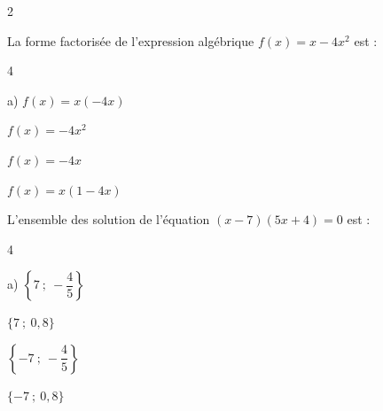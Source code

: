 \documentclass[11pt,a4paper]{article}  %
\begin{document}
\begin{enumMet}
\begin{multicols}{2}
\begin{enumMet}
		\item {}	
		\item {}	
	\end{enumMet}
	\end{multicols}
	 \item La forme factorisée de l'expression algébrique $f(x)=x-4 x^{2}$ est :
	\begin{multicols}{4}
		\begin{enumMet}
			\item a) $f(x)=x(-4 x)$
			\item $f(x)=-4 x^{2}$
			\item $f(x)=-4 x$
			\item $f(x)=x(1-4 x)$
		\end{enumMet}
	\end{multicols}
	\item L'ensemble des solution de l'équation $(x-7)(5 x+4)=0$ est :
	\begin{multicols}{4}
		\begin{enumMet}
			\item a) $\left\{7\ ;\ -\dfrac{4}{5}\right\}$
			\item $\{7\ ;\ 0,8\}$
			\item $\left\{-7\ ;\ -\dfrac{4}{5}\right\}$
			\item $\{-7\ ;\ 0,8\}$
		\end{enumMet}
	\end{multicols}
\end{enumMet}

\newpage
\exerciceDS{}
\end{document}
